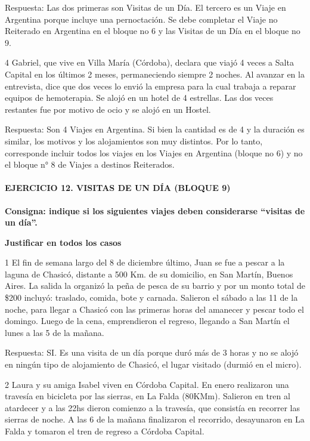 \documentclass[
  openany]{book}
\begin{document}
Respuesta: Las dos primeras son Visitas de un Día. El tercero es un Viaje en Argentina porque incluye una pernoctación. Se debe completar el Viaje no Reiterado en Argentina en el bloque no 6 y las Visitas de un Día en el bloque no 9.

4 Gabriel, que vive en Villa María (Córdoba), declara que viajó 4 veces a Salta Capital en los últimos 2 meses, permaneciendo siempre 2 noches. Al avanzar en la entrevista, dice que dos veces lo envió la empresa para la cual trabaja a reparar equipos de hemoterapia. Se alojó en un hotel de 4 estrellas. Las dos veces restantes fue por motivo de ocio y se alojó en un Hostel.

Respuesta: Son 4 Viajes en Argentina. Si bien la cantidad es de 4 y la duración es similar, los motivos y los alojamientos son muy distintos. Por lo tanto, corresponde incluir todos los viajes en los Viajes en Argentina (bloque no 6) y no el bloque n° 8 de Viajes a destinos Reiterados.

\hypertarget{ejercicio-12.-visitas-de-un-duxeda-bloque-9-1}{%
\paragraph{\texorpdfstring{\textbf{EJERCICIO 12. VISITAS DE UN DÍA (BLOQUE 9)}}{EJERCICIO 12. VISITAS DE UN DÍA (BLOQUE 9)}}\label{ejercicio-12.-visitas-de-un-duxeda-bloque-9-1}}

\textbf{Consigna: indique si los siguientes viajes deben considerarse ``visitas de un día''.}

\textbf{Justificar en todos los casos}

1 El fin de semana largo del 8 de diciembre último, Juan se fue a pescar a la laguna de Chasicó, distante a 500 Km. de su domicilio, en San Martín, Buenos Aires. La salida la organizó la peña de pesca de su barrio y por un monto total de \$200 incluyó: traslado, comida, bote y carnada. Salieron el sábado a las 11 de la noche, para llegar a Chasicó con las primeras horas del amanecer y pescar todo el domingo. Luego de la cena, emprendieron el regreso, llegando a San Martín el lunes a las 5 de la mañana.

Respuesta: SI. Es una visita de un día porque duró más de 3 horas y no se alojó en ningún tipo de alojamiento de Chasicó, el lugar visitado (durmió en el micro).

2 Laura y su amiga Isabel viven en Córdoba Capital. En enero realizaron una travesía en bicicleta por las sierras, en La Falda (80KMm). Salieron en tren al atardecer y a las 22hs dieron comienzo a la travesía, que consistía en recorrer las sierras de noche. A las 6 de la mañana finalizaron el recorrido, desayunaron en La Falda y tomaron el tren de regreso a Córdoba Capital.
\end{document}
